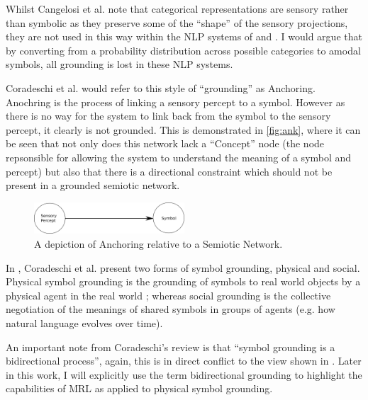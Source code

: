 Whilst Cangelosi et al. note that categorical representations are sensory rather than symbolic as they preserve some of the ``shape'' of the sensory projections, they are not used in this way within the \ac{NLP} systems of \cite{lemonlearning} and \cite{yu2017learning}. I would argue that by converting from a probability distribution across possible categories to amodal symbols, all grounding is lost in these \ac{NLP} systems.

Coradeschi et al. \cite{coradeschi2000anchoring, coradeschi2003introduction} would refer to this style of ``grounding'' as Anchoring. Anochring is the process of linking a sensory percept to a symbol. However as there is no way for the system to link back from the symbol to the sensory percept, it clearly is not grounded. This is demonstrated in \autoref{fig:ank}, where it can be seen that not only does this network lack a ``Concept'' node (the node repsonsible for allowing the system to understand the meaning of a symbol and percept) but also that there is a directional constraint which should not be present in a grounded semiotic network. 

\begin{figure}
\centering
\includegraphics[width=0.5\textwidth]{Figs/litReview/anchoring.png}
\caption{A depiction of Anchoring relative to a Semiotic Network.}
\label{fig:ank}

\end{figure}


In \cite{coradeschi2013short}, Coradeschi et al. present two forms of symbol grounding, physical and social. Physical symbol grounding is the grounding of symbols to real world objects by a physical agent in the real world \cite{vogt2002physical}; whereas social grounding is the collective negotiation of the meanings of shared symbols in groups of agents \cite{cangelosi2006grounding} (e.g. how natural language evolves over time).

An important note from Coradeschi's review \cite{coradeschi2013short} is that ``symbol grounding is a bidirectional process'', again, this is in direct conflict to the view shown in \cite{lemonlearning, yu2017learning}. Later in this work, I will explicitly use the term bidirectional grounding to highlight the capabilities of \ac{MRL} as applied to physical symbol grounding.

